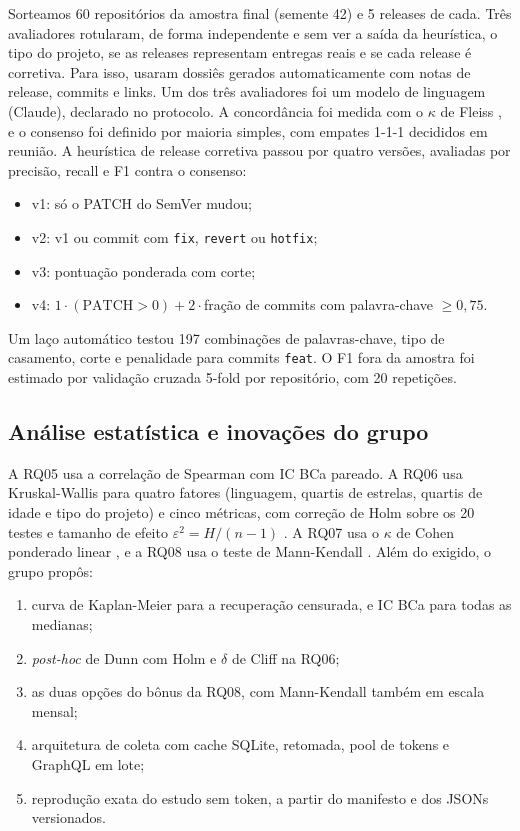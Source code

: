 \documentclass[12pt]{article}
\newcommand{\code}[1]{\texttt{\small #1}}
\begin{document}
Sorteamos 60 repositórios da amostra final (semente 42) e 5 releases de cada.
Três avaliadores rotularam, de forma independente e sem ver a saída da
heurística, o tipo do projeto, se as releases representam entregas reais e
se cada release é corretiva. Para isso, usaram dossiês gerados
automaticamente com notas de release, commits e links. Um dos três
avaliadores foi um modelo de linguagem (Claude), declarado no protocolo. A
concordância foi medida com o $\kappa$ de Fleiss \cite{fleiss1971}, e o
consenso foi definido por maioria simples, com empates 1-1-1 decididos em
reunião. A heurística de release corretiva passou por quatro versões,
avaliadas por precisão, recall e F1 contra o consenso:
\begin{itemize}
  \item v1: só o PATCH do SemVer mudou;
  \item v2: v1 ou commit com \code{fix}, \code{revert} ou \code{hotfix};
  \item v3: pontuação ponderada com corte;
  \item v4: $1\cdot(\mbox{PATCH}>0) + 2\cdot{}$fração de commits com
    palavra-chave $\geq 0{,}75$.
\end{itemize}
Um laço automático testou 197 combinações de palavras-chave, tipo de
casamento, corte e penalidade para commits \code{feat}. O F1 fora da amostra
foi estimado por validação cruzada 5-fold por repositório, com 20 repetições.

\subsection{Análise estatística e inovações do grupo}

A RQ05 usa a correlação de Spearman com IC BCa pareado. A RQ06 usa
Kruskal-Wallis \cite{kruskal1952} para quatro fatores (linguagem, quartis de
estrelas, quartis de idade e tipo do projeto) e cinco métricas, com correção
de Holm \cite{holm1979} sobre os 20 testes e tamanho de efeito
$\varepsilon^2 = H/(n-1)$ \cite{rea1992}. A RQ07 usa o $\kappa$ de Cohen
ponderado linear \cite{cohen1968}, e a RQ08 usa o teste de Mann-Kendall
\cite{mann1945}. Além do exigido, o grupo propôs:
\begin{enumerate}[label=(\roman*)]
  \item curva de Kaplan-Meier \cite{kaplan1958} para a recuperação censurada,
    e IC BCa para todas as medianas;
  \item \emph{post-hoc} de Dunn \cite{dunn1964} com Holm e $\delta$ de Cliff
    \cite{romano2006} na RQ06;
  \item as duas opções do bônus da RQ08, com Mann-Kendall também em escala
    mensal;
  \item arquitetura de coleta com cache SQLite, retomada, pool de tokens e
    GraphQL em lote;
  \item reprodução exata do estudo sem token, a partir do manifesto e dos
    JSONs versionados.
\end{enumerate}
\end{document}
